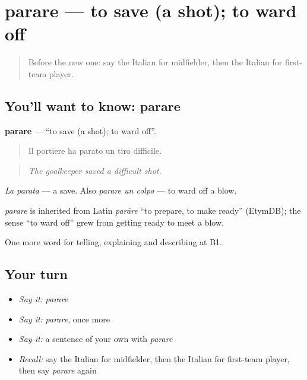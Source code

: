 \section[parare]{parare — to save (a shot); to ward off}

\label{lesson:IT-C510-parare}



\begin{quote}
Before the new one: say the Italian for midfielder, then the Italian for first-team player.
\end{quote}

\subsection*{You'll want to know: parare}
\textbf{parare} — \textquotedblleft{}to save (a shot); to ward off\textquotedblright{}.

\begin{quote}
Il portiere ha parato un tiro difficile.
\end{quote}

\begin{quote}
\emph{The goalkeeper saved a difficult shot.}
\end{quote}

\emph{La parata} — a save. Also \emph{parare un colpo} — to ward off a blow.

\begin{cousinweb}
\emph{parare} is inherited from Latin \emph{parāre} \textquotedblleft{}to prepare, to make ready\textquotedblright{} (EtymDB); the sense \textquotedblleft{}to ward off\textquotedblright{} grew from getting ready to meet a blow.
\end{cousinweb}

\begin{grammarlens}[title={What you've built}]
One more word for telling, explaining and describing at B1.
\end{grammarlens}

\subsection*{Your turn}
\begin{itemize}
\raggedright
  \item \emph{Say it:} \emph{parare}
  \item \emph{Say it:} \emph{parare}, once more
  \item \emph{Say it:} a sentence of your own with \emph{parare}
  \item \emph{Recall:} say the Italian for midfielder, then the Italian for first-team player, then say \emph{parare} again
\end{itemize}

